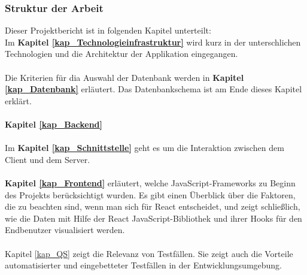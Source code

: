 \subsubsection*{Struktur der Arbeit}
Dieser Projektbericht ist in folgenden Kapitel unterteilt:\\
Im \textbf{Kapitel \ref{kap_Technologieinfrastruktur}} wird kurz in der unterschlichen Technologien und die Architektur der Applikation eingegangen.
\\\\
Die Kriterien für dia Auswahl der Datenbank werden in \textbf{Kapitel \ref{kap_Datenbank}} erläutert. Das Datenbankschema ist am Ende dieses Kapitel erklärt.
\\\\
\textbf{Kapitel \ref{kap_Backend}} 
\\\\
Im \textbf{Kapitel \ref{kap_Schnittstelle}} geht es um die Interaktion zwischen dem Client und dem Server. 
\\\\
\textbf{Kapitel \ref{kap_Frontend}} erläutert, welche JavaScript-Frameworks zu Beginn des Projekts berücksichtigt wurden. Es gibt einen Überblick über die Faktoren, die zu beachten sind, wenn man sich für React entscheidet, und zeigt schließlich, wie die Daten mit Hilfe der React JavaScript-Bibliothek und ihrer Hooks für den Endbenutzer visualisiert werden.
\\\\
Kapitel \ref{kap_QS} zeigt die Relevanz von Testfällen. Sie zeigt auch die Vorteile automatisierter und eingebetteter Testfällen in der Entwicklungsumgebung.

